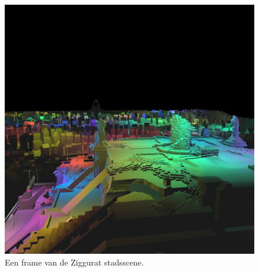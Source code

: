 \begin{figure}[t]
  \centering\includegraphics[width=\textwidth]{./img/raw/test-suite-ziggurat-city-frame.png}
  \caption{Een frame van de Ziggurat stadsscene.}
  \label{fig:test-suite-ziggurat-frame}
  
\end{figure}
